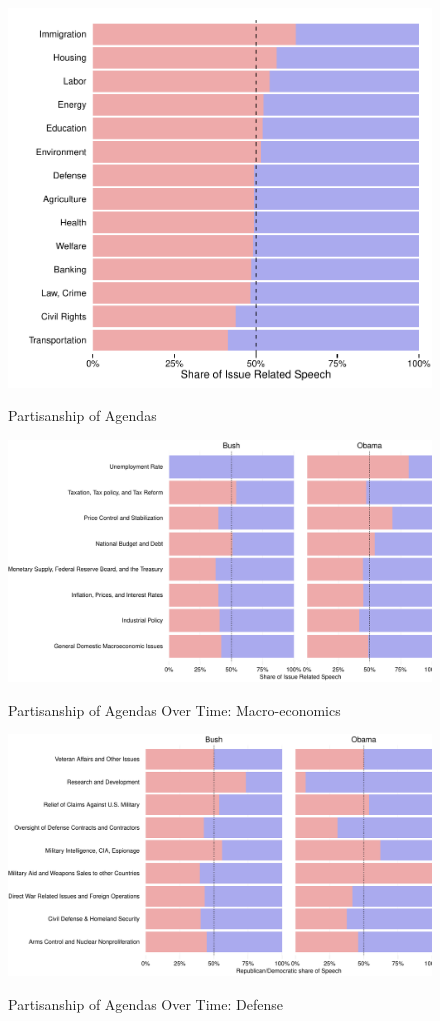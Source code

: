 \documentclass[12pt, letterpaper]{article}
\begin{document}
\begin{figure}[H]
\centering
\caption{Partisanship of Agendas}
\includegraphics[width=.75\textwidth]{../figs/partisan_issue.pdf}\label{partisan_issue}
\end{figure}

\begin{figure}[H]
\centering
\caption{Partisanship of Agendas Over Time: Macro-economics}
\includegraphics[width=.75\textwidth]{../figs/macro_by_obama.pdf}\label{partisan_issue}
\end{figure}

\begin{figure}[H]
\centering
\caption{Partisanship of Agendas Over Time: Defense}
\includegraphics[width=.75\textwidth]{../figs/mil_by_obama.pdf}\label{partisan_issue}
\end{figure}
\end{document}
